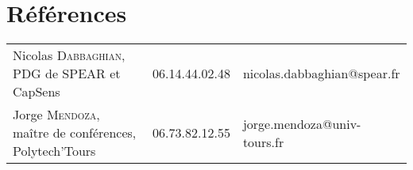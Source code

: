 \documentclass[11pt,a4paper]{moderncv}
\begin{document}
\section{Références}
\begin{tabular}{ p{}
                 p{}
                 p{} }
  \hspace{0.7em} Nicolas \textsc{Dabbaghian}, \scriptsize{PDG de SPEAR et CapSens} & 06.14.44.02.48 & nicolas.dabbaghian@spear.fr \\
  \hspace{0.7em} Jorge \textsc{Mendoza}, \scriptsize{maître de conférences, Polytech'Tours} & 06.73.82.12.55 & jorge.mendoza@univ-tours.fr \\
\end{tabular}
\end{document}
